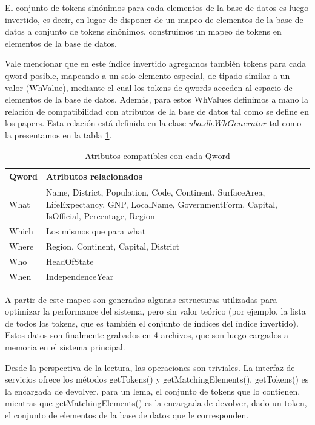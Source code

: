 El conjunto de tokens sinónimos para cada elementos de la base de datos es luego invertido, es decir, en lugar de disponer de un mapeo de elementos de la base de datos a conjunto de tokens sinónimos, construimos un mapeo de tokens en elementos de la base de datos.

Vale mencionar que en este índice invertido agregamos también tokens para cada qword posible, mapeando a un solo elemento especial, de tipado similar a un valor (WhValue), mediante el cual los tokens de qwords acceden al espacio de elementos de la base de datos. Además, para estos WhValues definimos a mano la relación de compatibilidad con atributos de la base de datos tal como se define en los papers. Esta relación está definida en la clase $uba.db.WhGenerator$ tal como la presentamos en la tabla \ref{table:atributos-qwords}.

\begin{center}
\begin{table}[h]
\centering
\begin{tabular}{| l |  p{12cm} |}
\hline
Qword & Atributos relacionados \\ \hline
What & Name, District, Population, Code, Continent, SurfaceArea, LifeExpectancy, GNP, LocalName, GovernmentForm,
                         Capital, IsOfficial, Percentage, Region \\ \hline
Which & Los mismos que para what\\ \hline
Where & Region, Continent, Capital, District\\ \hline
Who & HeadOfState\\ \hline
When & IndependenceYear\\ \hline
\end{tabular}
\caption{Atributos compatibles con cada Qword}
\label{table:atributos-qwords}
\end{table}
\end{center}

A partir de este mapeo son generadas algunas estructuras utilizadas para optimizar la performance del sistema, pero sin valor teórico (por ejemplo, la lista de todos los tokens, que es también el conjunto de índices del índice invertido). Estos datos son finalmente grabados en 4 archivos, que son luego cargados a memoria en el sistema principal.

Desde la perspectiva de la lectura, las operaciones son triviales. La interfaz de servicios ofrece los métodos getTokens() y getMatchingElements(). getTokens() es la encargada de devolver, para un lema, el conjunto de tokens que lo contienen, mientras que getMatchingElements() es la encargada de devolver, dado un token, el conjunto de elementos de la base de datos que le corresponden.

